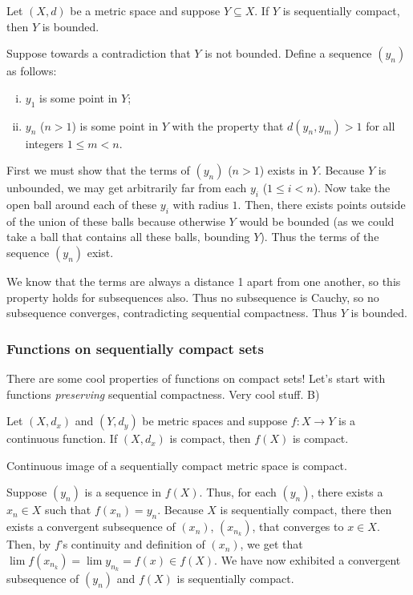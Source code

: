 \documentclass[class=article, crop=false]{standalone}
\begin{document}
\begin{thm}{\label{thm:seqcompactisbounded}}
    Let $(X,d)$ be a metric space and suppose $Y \subseteq X$. If $Y$ is sequentially compact, then $Y$ is bounded.
\end{thm}
\begin{pf}
    Suppose towards a contradiction that $Y$ is not bounded. Define a sequence $(y_n)$ as follows:
        \begin{enumerate}[(i)]
            \item $y_1$ is some point in $Y$;
            \item $y_n$  ($n > 1$) is some point in $Y$ with the property that $d(y_n,y_m) > 1$ for all integers $1 \leq m < n$.
        \end{enumerate}
    First we must show that the terms of $(y_n)$ ($n > 1$) exists in $Y$. Because $Y$ is unbounded, we may get arbitrarily far from each $y_i$ ($1 \leq i <n$). Now take the open ball around each of these $y_i$ with radius $1$. Then, there exists points outside of the union of these balls because otherwise $Y$ would be bounded (as we could take a ball that contains all these balls, bounding $Y$). Thus the terms of the sequence $(y_n)$ exist.

    We know that the terms are always a distance 1 apart from one another, so this property holds for subsequences also. Thus no subsequence is Cauchy, so no subsequence converges, contradicting sequential compactness. Thus $Y$ is bounded.
\end{pf}


\subsubsection*{Functions on sequentially compact sets}

There are some cool properties of functions on compact sets! Let's start with functions \textit{preserving} sequential compactness. Very cool stuff. B)

\begin{thm}{\label{thm:contpreserveseqcomp}}
    Let $(X,d_x)$ and $(Y,d_y)$ be metric spaces and suppose $f \colon X \to Y$ is a continuous function. If $(X,d_x)$ is compact, then $f(X)$ is compact.
\end{thm}
\begin{slogan}
    Continuous image of a sequentially compact metric space is compact.
\end{slogan}
\begin{pf}
    Suppose $(y_n)$ is a sequence in $f(X)$. Thus, for each $(y_n)$, there exists a $x_n \in X$ such that $f(x_n) = y_n$. Because $X$ is sequentially compact, there then exists a convergent subsequence of $(x_n)$, $(x_{n_k})$, that converges to $x \in X$. Then, by $f$'s continuity and definition of $(x_n)$, we get that $\lim f(x_{n_k}) = \lim y_{n_k} = f(x) \in f(X)$. We have now exhibited a convergent subsequence of $(y_n)$ and $f(X)$ is sequentially compact.
\end{pf}
\end{document}
